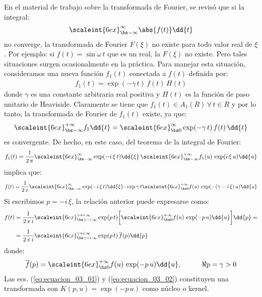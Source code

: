 En el material de trabajo sobre la transformada de Fourier, se revisó que si la integral:
\begin{align*}
\scaleint{6ex}_{\bs -\infty}^{\infty} \abs{f(t)} \dd{t}
\end{align*}
no converge, la transformada de Fourier $F(\xi)$ no existe para todo valor real de $\xi$. Por ejemplo: si $f(t) = \sin \omega \, t$ que es un real, la $F(\xi)$ no existe. Pero tales situaciones surgen ocasionalmente en la práctica. Para manejar esta situación, consideramos una nueva función $f_{1} (t)$ conectada a $f (t)$ definida por:
\begin{align*}
f_{1}(t) =  \exp(- \gamma \, t) \, f(t) \, H(t)
\end{align*}
donde $\gamma$ es una constante arbitraria real positiva y $H(t)$ es la función de paso unitario de Heaviside. Claramente se tiene que $f_{1}(t) \in A_{1}(R) \, \forall \, t \in R$ y por lo tanto, la transformada de Fourier de $f_{1}(t)$ existe, ya que:
\begin{align*}
\scaleint{6ex}_{\bs -\infty}^{+\infty} f_{1} \dd{t} = \scaleint{6ex}_{\bs 0}^{\infty} \exp(-\gamma \, t) \, f(t) \, \dd{t}
\end{align*}
es convergente. De hecho, en este caso, del teorema de la integral de Fourier:
\begin{align*}
f_{1} (t) = \dfrac{1}{2 \, \pi} \scaleint{6ex}_{\bs -\infty}^{\infty} \exp(-i \, \xi \, t) \dd{\xi} \, \scaleint{6ex}_{\bs -\infty}^{+\infty} f_{1}(u) \, \exp(i \, \xi \, u) \dd{u}
\end{align*}
implica que:
\begin{align*}
f (t) = \dfrac{1}{2 \, \pi} \scaleint{6ex}_{\bs -\infty}^{\infty} \exp(-i \, \xi \, t) \dd{\xi} \cdot \exp{\gamma \, t} \scaleint{6ex}_{\bs 0}^{+\infty} f(u) \, \exp(- (\gamma - i \, \xi) \, u) \dd{u}
\end{align*}
Si escribimos $p = - i \, \xi$, la relación anterior puede expresarse como:
\begin{align}
\begin{aligned}[b]
f (t) &= \dfrac{1}{2 \, \pi \, i} \scaleint{6ex}_{\bs \gamma -i \, \infty}^{\gamma + i \, \infty} \exp(p \, t) \bigg[ \scaleint{6ex}_{\bs 0}^{+\infty} f(u) \, \exp(- p \, u) \dd{u} \bigg] \dd{p} = \\[0.5em]
&= \dfrac{1}{2 \, \pi \, i} \scaleint{6ex}_{\bs \gamma -i \, \infty}^{\gamma + i \, \infty} \exp(p \, t) \, \overline{f} (p) \dd{p} 
\end{aligned}
\label{eq:ecuacion_03_01}
\end{align}
donde:
\begin{align}
\overline{f} (p) = \scaleint{6ex}_{\bs 0}^{+\infty} f(u) \, \exp(- p \, u) \dd{u}, \hspace{1cm} \Re{p} = \gamma > 0
\label{eq:ecuacion_03_02}
\end{align}
Las ecs. (\ref{eq:ecuacion_03_01}) y (\ref{eq:ecuacion_03_02}) constituyen una transformada con $K(p, u) = \exp(- p \, u)$ como núcleo o kernel.

